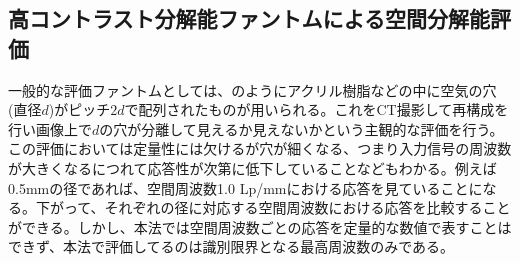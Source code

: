 \subsection{高コントラスト分解能ファントムによる空間分解能評価}
一般的な評価ファントムとしては、のようにアクリル樹脂などの中に空気の穴(直径$d$)がピッチ$2d$で配列されたものが用いられる。これをCT撮影して再構成を行い画像上で$d$の穴が分離して見えるか見えないかという主観的な評価を行う。この評価においては定量性には欠けるが穴が細くなる、つまり入力信号の周波数が大きくなるにつれて応答性が次第に低下していることなどもわかる。例えば0.5mmの径であれば、空間周波数1.0 Lp/mmにおける応答を見ていることになる。下がって、それぞれの径に対応する空間周波数における応答を比較することができる。しかし、本法では空間周波数ごとの応答を定量的な数値で表すことはできず、本法で評価してるのは識別限界となる最高周波数のみである。

